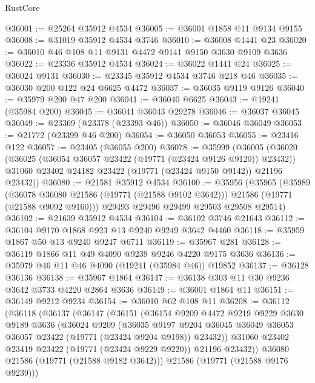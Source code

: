 \begin{lexlean}{RustCore}
\begin{coremodule}
@36001 := @25264 @35912 @4534
@36005 := @36001 @1858 @11 @9134 @9155
@36008 := @31019 @35912 @4534 @3746
@36010 := @36008 @1441 @23
@36020 := @36010 @46 @108 @11 @9131 @4472 @9141 @9150 @3630 @9109 @3636
@36022 := @23336 @35912 @4534
@36024 := @36022 @1441 @24
@36025 := @36024 @9131
@36030 := @23345 @35912 @4534 @3746 @218 @46
@36035 := @36030 @200 @122 @24 @6625 @4472
@36037 := @36035 @9119 @9126
@36040 := @35979 @200 @47 @200
@36041 := @36040 @6625
@36043 := @19241 (@35984 @200)
@36045 := @36041 @36043 @29278
@36046 := @36037 @36045
@36049 := @23369 (@23378 (@23393 @46))
@36050 := @36046 @36049
@36053 := @21772 (@23399 @46 @200)
@36054 := @36050 @36053
@36055 := @23416 @122
@36057 := @23405 (@36055 @200)
@36078 := @35999
    (@36005
      (@36020
        (@36025 (@36054 @36057 @23422 (@19771 (@23424 @9126 @9120)) @23432))
        @31060
        @23402
        @24182
        @23422
        (@19771 (@23424 @9150 @9142))
        @21196
        @23432))
@36080 := @21581 @35912 @4534
@36100 := @35956
    (@35965
      (@35989
        (@36078 @36080 @21586 (@19771 (@21588 @9102 @3642)))
        @21586
        (@19771 (@21588 @9092 @9160)))
      @29493
      @29496
      @29499
      @29503
      @29508
      @29514)
@36102 := @21639 @35912 @4534
@36104 := @36102 @3746 @21643
@36112 := @36104 @9170 @1868 @923 @13 @9240 @9249 @3642 @4460
@36118 := @35959 @1867 @50 @13 @9240 @9247 @6711
@36119 := @35967 @281
@36128 := @36119 @1866 @11 @49 @4090 @9239 @9246 @4220 @9175 @3636
@36136 := @35979 @46 @11 @46 @4090 (@19241 (@35984 @46)) @19852
@36137 := @36128 @36136
@36138 := @35967 @1864
@36147 := @36138 @303 @11 @30 @9236 @3642 @3733 @4220 @2864 @3636
@36149 := @36001 @1864 @11
@36151 := @36149 @9212 @9234
@36154 := @36010 @62 @108 @11
@36208 := @36112
    (@36118
      (@36137
        (@36147
          (@36151
            (@36154
              @9209
              @4472
              @9219
              @9229
              @3630
              @9189
              @3636
              (@36024
                @9209
                (@36035
                  @9197
                  @9204
                  @36045
                  @36049
                  @36053
                  @36057
                  @23422
                  (@19771 (@23424 @9204 @9198))
                  @23432))
              @31060
              @23402
              @23419
              @23422
              (@19771 (@23424 @9229 @9220))
              @21196
              @23432))
          @36080
          @21586
          (@19771 (@21588 @9182 @3642)))
        @21586
        (@19771 (@21588 @9176 @9239)))

\end{coremodule}
\end{lexlean}
